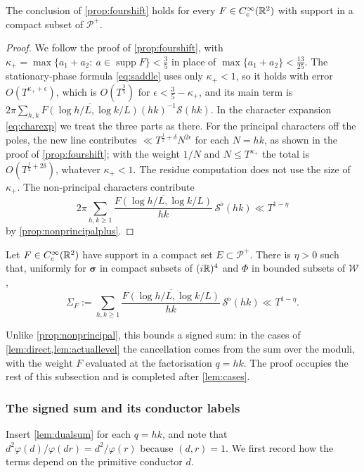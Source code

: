 \documentclass[11pt,colorlinks]{charlie}
\begin{document}
\begin{proposition}\label{prop:fourshiftplus}
The conclusion of \cref{prop:fourshift} holds for every $F\in C_c^\infty(\mathbb{R}^2)$ with support in a compact subset of $\mathcal P^+$.
\end{proposition}
\begin{proof}
We follow the proof of \cref{prop:fourshift}, with $\kappa_+=\max\{a_1+a_2:\ a\in\operatorname{supp}F\}<\frac35$ in place of $\max\{a_1+a_2\}<\frac{13}{25}$. The stationary-phase formula \eqref{eq:saddle} uses only $\kappa_+<1$, so it holds with error $O(T^{\kappa_++\epsilon})$, which is $O(T^{\frac35})$ for $\epsilon<\frac35-\kappa_+$, and its main term is $2\pi\sum_{h,k}\overline{F(\log h/L,\log k/L)}(hk)^{-1}\mathcal S(hk)$. In the character expansion \eqref{eq:charexp} we treat the three parts as there. For the principal characters off the poles, the new line contributes $\ll T^{\frac12+\delta}N^{2\epsilon}$ for each $N=hk$, as shown in the proof of \cref{prop:fourshift}; with the weight $1/N$ and $N\le T^{\kappa_+}$ the total is $O(T^{\frac12+2\delta})$, whatever $\kappa_+<1$. The residue computation does not use the size of $\kappa_+$. The non-principal characters contribute
\[
 2\pi\sum_{h,k\ge1}\frac{\overline{F(\log h/L,\log k/L)}}{hk}\,\mathcal S^\flat(hk)\ll T^{1-\eta}
\]
by \cref{prop:nonprincipalplus}.
\end{proof}

\begin{proposition}\label{prop:nonprincipalplus}
Let $F\in C_c^\infty(\mathbb{R}^2)$ have support in a compact set $E\subset\mathcal P^+$. There is $\eta>0$ such that, uniformly for $\boldsymbol\sigma$ in compact subsets of $(i\mathbb{R})^4$ and $\Phi$ in bounded subsets of $\mathcal W$,
\[
 \Sigma_F:=\sum_{h,k\ge1}\frac{\overline{F(\log h/L,\log k/L)}}{hk}\,\mathcal S^\flat(hk)\ll T^{1-\eta}.
\]
\end{proposition}

Unlike \cref{prop:nonprincipal}, this bounds a signed sum: in the cases of \cref{lem:direct,lem:actuallevel} the cancellation comes from the sum over the moduli, with the weight $F$ evaluated at the factorisation $q=hk$. The proof occupies the rest of this subsection and is completed after \cref{lem:cases}.

\subsubsection*{The signed sum and its conductor labels}
Insert \cref{lem:dualsum} for each $q=hk$, and note that $d^2\varphi(d)/\varphi(dr)=d^2/\varphi(r)$ because $(d,r)=1$. We first record how the terms depend on the primitive conductor $d$.
\end{document}
